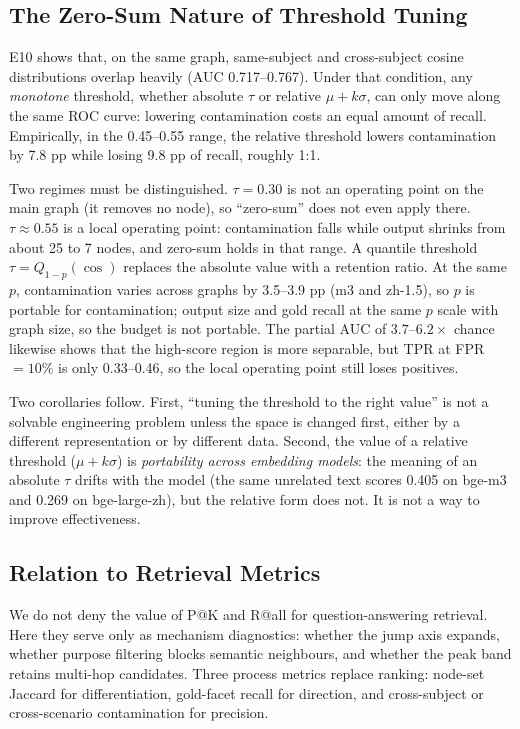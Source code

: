 \documentclass[11pt]{article}
\begin{document}
\subsection{The Zero-Sum Nature of Threshold Tuning}
\label{sec:zerosum}

E10 shows that, on the same graph, same-subject and cross-subject cosine distributions overlap
heavily (AUC 0.717--0.767). Under that condition, any \emph{monotone} threshold, whether
absolute $\tau$ or relative $\mu+k\sigma$, can only move along the same ROC curve: lowering
contamination costs an equal amount of recall. Empirically, in the 0.45--0.55 range, the relative
threshold lowers contamination by 7.8 pp while losing 9.8 pp of recall, roughly 1:1.

Two regimes must be distinguished. $\tau=0.30$ is not an operating point on the main graph (it
removes no node), so ``zero-sum'' does not even apply there. $\tau\approx0.55$ is a local
operating point: contamination falls while output shrinks from about 25 to 7 nodes, and zero-sum
holds in that range. A quantile threshold $\tau=Q_{1-p}(\cos)$ replaces the absolute value with a
retention ratio. At the same $p$, contamination varies across graphs by 3.5--3.9 pp (m3 and
zh-1.5), so $p$ is portable for contamination; output size and gold recall at the same $p$ scale
with graph size, so the budget is not portable. The partial AUC of $3.7$--$6.2\times$ chance
likewise shows that the high-score region is more separable, but TPR at FPR$=10\%$ is only
0.33--0.46, so the local operating point still loses positives.

Two corollaries follow. First, ``tuning the threshold to the right value'' is not a solvable
engineering problem unless the space is changed first, either by a different representation or
by different data. Second, the value of a relative threshold ($\mu+k\sigma$) is
\emph{portability across embedding models}: the meaning of an absolute $\tau$ drifts with the
model (the same unrelated text scores 0.405 on bge-m3 and 0.269 on bge-large-zh), but the
relative form does not. It is not a way to improve effectiveness.

\subsection{Relation to Retrieval Metrics}
\label{sec:metrics}

We do not deny the value of P@K and R@all for question-answering retrieval. Here they serve only
as mechanism diagnostics: whether the jump axis expands, whether purpose filtering blocks
semantic neighbours, and whether the peak band retains multi-hop candidates. Three process
metrics replace ranking: node-set Jaccard for differentiation, gold-facet recall for direction,
and cross-subject or cross-scenario contamination for precision.
\end{document}
